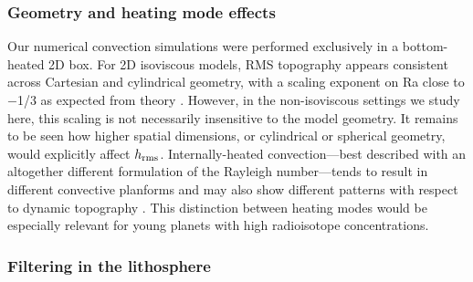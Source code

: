 \documentclass[trackchanges]{aastex63}
\newcommand{\todo}[1]{\textit{\textcolor{violet}{{#1}}}}
\begin{document}



\subsubsection{Geometry and heating mode effects}

Our numerical convection simulations were performed exclusively in a bottom-heated 2D box. For 2D isoviscous models, RMS topography appears consistent across Cartesian and cylindrical geometry, with a scaling exponent on Ra close to $-$1/3 as expected from theory \citep{mckenzie_convection_1974, parsons_relationship_1983}. However, in the non-isoviscous settings we study here, this scaling is not necessarily insensitive to the model geometry. It remains to be seen how higher spatial dimensions, or cylindrical or spherical geometry, would explicitly affect $h_{\rm rms}$. Internally-heated convection---best described with an altogether different formulation of the Rayleigh number---tends to result in different convective planforms and may also show different patterns with respect to dynamic topography \citep[e.g.,][]{orth_isostatic_2011}. This distinction between heating modes would be especially relevant for young planets with high radioisotope concentrations.





\subsubsection{Filtering in the lithosphere} \label{sec:elastic}
\end{document}
